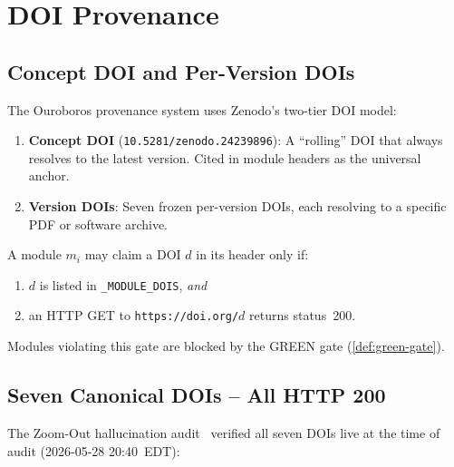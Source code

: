 \section{DOI Provenance}
\label{sec:doi-provenance}

\subsection{Concept DOI and Per-Version DOIs}
\label{ssec:concept-doi}

The Ouroboros provenance system uses Zenodo's two-tier DOI model:

\begin{enumerate}
  \item \textbf{Concept DOI} (\texttt{10.5281/zenodo.24239896}): A
    ``rolling'' DOI that always resolves to the latest version.  Cited in
    module headers as the universal anchor.
  \item \textbf{Version DOIs}: Seven frozen per-version DOIs, each
    resolving to a specific PDF or software archive.
\end{enumerate}

\begin{theorem}
  \label{thm:doi-integrity}
  A module \(m_i\) may claim a DOI \(d\) in its header only if:
  \begin{enumerate}
    \item \(d\) is listed in \texttt{\_MODULE\_DOIS}, \emph{and}
    \item an HTTP GET to \texttt{https://doi.org/}\(d\) returns status~200.
  \end{enumerate}
  Modules violating this gate are blocked by the GREEN gate
  (\cref{def:green-gate}).
\end{theorem}

\subsection{Seven Canonical DOIs -- All HTTP 200}
\label{ssec:seven-dois}

The Zoom-Out hallucination audit~\cite{szl_zoom_out_v18} verified all seven
DOIs live at the time of audit (2026-05-28 20:40~EDT):

